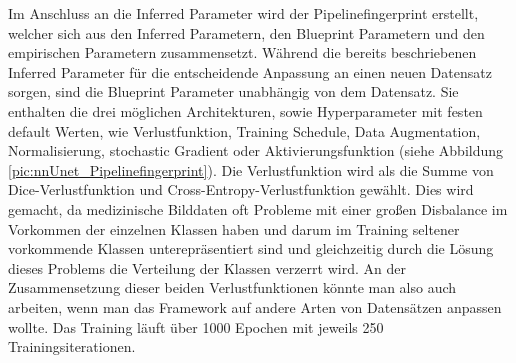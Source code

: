 Im Anschluss an die Inferred Parameter wird der Pipelinefingerprint erstellt, welcher sich aus den Inferred Parametern, den Blueprint Parametern und den empirischen Parametern zusammensetzt. Während die bereits beschriebenen Inferred Parameter für die entscheidende Anpassung an einen neuen Datensatz sorgen, sind die Blueprint Parameter unabhängig von dem Datensatz. Sie enthalten die drei möglichen Architekturen, sowie Hyperparameter mit festen default Werten, wie Verlustfunktion, Training Schedule, Data Augmentation, Normalisierung, stochastic Gradient oder  Aktivierungsfunktion (siehe Abbildung \ref{pic:nnUnet_Pipelinefingerprint}). Die Verlustfunktion wird als die Summe von Dice-Verlustfunktion und Cross-Entropy-Verlustfunktion gewählt. Dies wird gemacht, da medizinische Bilddaten oft Probleme mit einer großen Disbalance im Vorkommen der einzelnen Klassen haben und darum im Training seltener vorkommende Klassen unterepräsentiert sind und gleichzeitig durch die Lösung dieses Problems die Verteilung der Klassen verzerrt wird. An der Zusammensetzung dieser beiden Verlustfunktionen könnte man also auch arbeiten, wenn man das Framework auf andere Arten von Datensätzen anpassen wollte. Das Training läuft über 1000 Epochen mit jeweils 250 Trainingsiterationen. 

